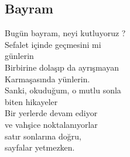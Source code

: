 \subsection{Bayram}

Bugün bayram, neyi kutluyoruz ? \\
Sefalet içinde geçmesini mi \\
günlerin \\
Birbirine dolaşıp da ayrışmayan \\
Karmaşasında yünlerin. \\

\noindent\newline
Sanki, okuduğum, o mutlu sonla \\
biten hikayeler \\
Bir yerlerde devam ediyor \\
ve vahşice noktalanıyorlar \\
satır sonlarına doğru, \\
sayfalar yetmezken. \\